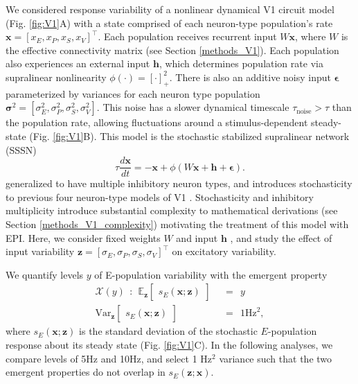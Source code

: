 \documentclass[11pt]{article}
\begin{document}
We considered response variability of a nonlinear dynamical V1 circuit model (Fig. \ref{fig:V1}A) with a state comprised of each neuron-type population's rate $\mathbf{x} = \left[x_E, x_P , x_S, x_V \right]^\top$.
Each population receives recurrent input $W \mathbf{x}$, where $W$ is the effective connectivity matrix (see Section \ref{methods_V1}).
Each population also experiences an external input $\mathbf{h}$, which determines population rate via supralinear nonlinearity $\phi(\cdot) = \left[\cdot \right]^2_+$.
There is also an additive noisy input $\bm{\epsilon}$ parameterized by variances for each neuron type population $\bm{\sigma}^2 = \left[ \sigma_E^2, \sigma_P^2, \sigma_S^2, \sigma_V^2\right]$.
This noise has a slower dynamical timescale $\tau_{\text{noise}} > \tau$ than the population rate, allowing fluctuations around a stimulus-dependent steady-state (Fig. \ref{fig:V1}B).
This model is the stochastic stabilized supralinear network (SSSN) \cite{hennequin2018dynamical} 
\begin{equation}
    \tau \frac{d\mathbf{x}}{dt} = -\mathbf{x} +\phi(W\mathbf{x} + \mathbf{h} + \bm{\epsilon}).
\end{equation}
generalized to have multiple inhibitory neuron types, and introduces stochasticity to previous four neuron-type models of V1 \cite{litwin2016inhibitory}.
Stochasticity and inhibitory multiplicity introduce substantial complexity to mathematical derivations (see Section \ref{methods_V1_complexity}) motivating the treatment of this model with EPI.
Here, we consider fixed weights $W$ and input $\mathbf{h}$ \cite{palmigiano2020structure}, and study the effect of input variability $\mathbf{z} = [\sigma_E, \sigma_P, \sigma_S, \sigma_V]^\top$ on excitatory variability.

We quantify levels $y$ of E-population variability with the emergent property
\begin{equation}\label{eq:EP_V1}
\begin{split}
\mathcal{X}(y) ~~:~~  \mathbb{E}_{\mathbf{z}}\begin{bmatrix} s_E(\mathbf{x}; \mathbf{z}) \end{bmatrix}  &~~=~~ y \\ 
 \text{Var}_{\mathbf{z}}\begin{bmatrix} s_E(\mathbf{x}; \mathbf{z}) \end{bmatrix}  &~~=~~  1 \text{Hz}^2,
\end{split}
\end{equation}
where $s_E(\mathbf{x}; \mathbf{z})$ is the standard deviation of the stochastic $E$-population response about its steady state (Fig. \ref{fig:V1}C).
In the following analyses, we compare levels of 5Hz and 10Hz, and select 1 Hz$^2$ variance such that the two emergent properties do not overlap in $s_E(\mathbf{z}; \mathbf{x})$.
\end{document}
